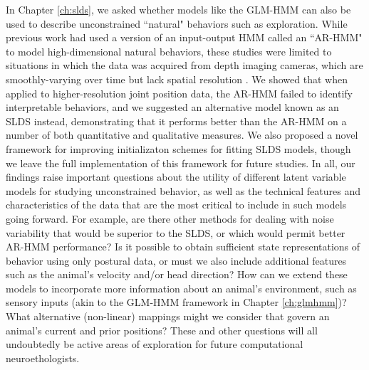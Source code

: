 In Chapter \ref{ch:slds}, we asked whether models like the GLM-HMM can also be used to describe unconstrained ``natural" behaviors such as exploration. While previous work had used a version of an input-output HMM called an ``AR-HMM" to model high-dimensional natural behaviors, these studies were limited to situations in which the data was acquired from depth imaging cameras, which are smoothly-varying over time but lack spatial resolution \cite{wiltschko_mapping_2015, markowitz_striatum_2018, wiltschko_revealing_2020}. We showed that when applied to higher-resolution joint position data, the AR-HMM failed to identify interpretable behaviors, and we suggested an alternative model known as an SLDS instead, demonstrating that it performs better than the AR-HMM on a number of both quantitative and qualitative measures. We also proposed a novel framework for improving initializaton schemes for fitting SLDS models, though we leave the full implementation of this framework for future studies. In all, our findings raise important questions about the utility of different latent variable models for studying unconstrained behavior, as well as the technical features and characteristics of the data that are the most critical to include in such models going forward. For example, are there other methods for dealing with noise variability that would be superior to the SLDS, or which would permit better AR-HMM performance? Is it possible to obtain sufficient state representations of behavior using only postural data, or must we also include additional features such as the animal's velocity and/or head direction? How can we extend these models to incorporate more information about an animal's environment, such as sensory inputs (akin to the GLM-HMM framework in Chapter \ref{ch:glmhmm})? What alternative (non-linear) mappings might we consider that govern an animal's current and prior positions? These and other questions will all undoubtedly be active areas of exploration for future computational neuroethologists. 

